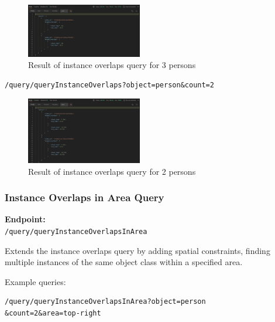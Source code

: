\documentclass[conference]{IEEEtran}
\begin{document}
\begin{figure}[H]
    \centering
    \includegraphics[width=0.45\textwidth]{6.jpeg}
    \caption{Result of instance overlaps query for 3 persons}
    \label{fig:query6}
\end{figure}

\begin{minipage}{\linewidth}
\scriptsize
\begin{verbatim}
/query/queryInstanceOverlaps?object=person&count=2
\end{verbatim}
\end{minipage}

\begin{figure}[H]
    \centering
    \includegraphics[width=0.45\textwidth]{7.jpeg}
    \caption{Result of instance overlaps query for 2 persons}
    \label{fig:query7}
\end{figure}

\subsubsection{Instance Overlaps in Area Query}
\textbf{Endpoint:} \\ 
\texttt{/query/queryInstanceOverlapsInArea}

Extends the instance overlaps query by adding spatial constraints, finding multiple instances of the same object class within a specified area.

Example queries:\\
\begin{minipage}{\linewidth}
\scriptsize
\begin{verbatim}
/query/queryInstanceOverlapsInArea?object=person
&count=2&area=top-right
\end{verbatim}
\end{minipage}
\end{document}
